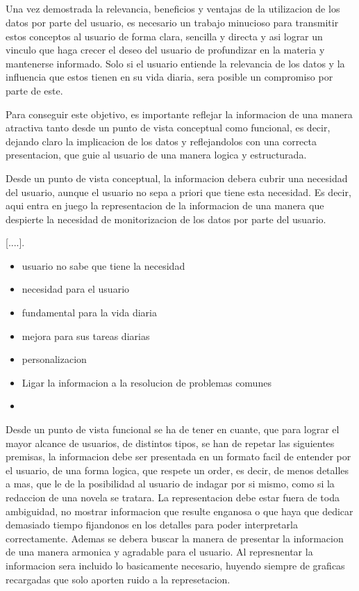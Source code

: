 \subsection*{}
Una vez demostrada la relevancia, beneficios y ventajas de la utilizacion de los datos por parte del usuario, es necesario un trabajo minucioso para
transmitir estos conceptos al usuario de forma clara, sencilla y directa y asi lograr un vinculo que haga crecer el deseo del usuario de profundizar en la materia y
mantenerse informado. 
Solo si el usuario entiende la relevancia de los datos y la influencia que estos tienen en su vida diaria, sera posible un compromiso por parte de este.

Para conseguir este objetivo, es importante reflejar la informacion de una manera atractiva tanto desde un punto de vista conceptual como funcional, 
es decir, dejando claro la implicacion de los datos y reflejandolos con una correcta presentacion, que guie al usuario de una manera logica y estructurada.

Desde un punto de vista conceptual, la informacion debera cubrir una necesidad del usuario, aunque el usuario no sepa a priori que tiene esta necesidad.
Es decir, aqui entra en juego la representacion de la informacion de una manera que despierte la necesidad de monitorizacion de los datos por parte
del usuario.

[....].
\begin{itemize}

\item usuario no sabe que tiene la necesidad
\item necesidad para el usuario
\item fundamental para la vida diaria
\item mejora para sus tareas diarias
\item personalizacion
\item Ligar la informacion a la resolucion de problemas comunes
\item \end{itemize}

Desde un punto de vista funcional se ha de tener en cuante, que para lograr el mayor alcance de usuarios, de distintos tipos, se han
de repetar las siguientes premisas,  la informacion debe ser presentada en un formato facil de entender por
el usuario, de una forma logica, que respete un order, es decir, de menos detalles a mas, que le de la posibilidad al usuario de indagar por si mismo, como
si la redaccion de una novela se tratara.
La representacion debe estar fuera de toda ambiguidad, no mostrar informacion que resulte enganosa o que haya que dedicar demasiado tiempo fijandonos
en los detalles para poder interpretarla correctamente.
Ademas se debera buscar la manera de presentar la informacion de una manera armonica y agradable para el usuario.
Al represnentar la informacion sera incluido lo basicamente necesario, huyendo siempre de graficas recargadas que solo aporten ruido a la represetacion.


